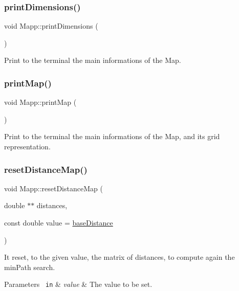 \subsubsection{\texorpdfstring{printDimensions()}{printDimensions()}}
{\footnotesize\ttfamily void Mapp\+::print\+Dimensions (\begin{DoxyParamCaption}{ }\end{DoxyParamCaption})}



Print to the terminal the main informations of the Map. 

\mbox{\label{class_mapp_ab795b79c5d655f6a62303c4a415ee73c}} 
\subsubsection{\texorpdfstring{printMap()}{printMap()}}
{\footnotesize\ttfamily void Mapp\+::print\+Map (\begin{DoxyParamCaption}{ }\end{DoxyParamCaption})}



Print to the terminal the main informations of the Map, and its grid representation. 

\mbox{\label{class_mapp_a6dac7b6cd03ed61e93aaa343c51862ea}} 
\subsubsection{\texorpdfstring{resetDistanceMap()}{resetDistanceMap()}}
{\footnotesize\ttfamily void Mapp\+::reset\+Distance\+Map (\begin{DoxyParamCaption}\item[{double $\ast$$\ast$}]{distances,  }\item[{const double}]{value = {\ttfamily \mbox{\hyperlink{class_mapp_ae6b2f015604d9f3e34c7702aea081e08}{base\+Distance}}} }\end{DoxyParamCaption})\hspace{0.3cm}{\ttfamily [protected]}}



It reset, to the given value, the matrix of distances, to compute again the min\+Path search. 


\begin{DoxyParams}[1]{Parameters}
\mbox{\texttt{ in}}  & {\em value} & The value to be set. \\
\hline
\end{DoxyParams}
\mbox{\label{class_mapp_a34bd022816ce083d4bb125119f47f470}} 
